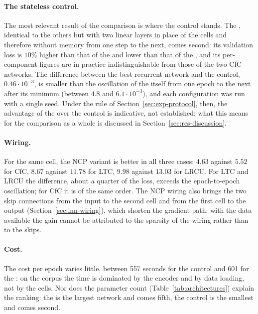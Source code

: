 \paragraph{The stateless control.}
The most relevant result of the comparison is where the control stands. The
, identical to the others but with two linear layers in
place of the cells and therefore without memory from one step to the next, comes
second: its validation loss is $10\%$ higher than that of the
 and lower than that of the , and
its per-component figures are in practice indistinguishable from those of the
two CfC networks. The difference between the best recurrent network and the
control, $0.46\cdot10^{-3}$, is smaller than the oscillation of the
 itself from one epoch to the next after its minimum
(between $4.8$ and $6.1\cdot10^{-3}$), and each configuration was run with a
single seed. Under the rule of Section~\ref{sec:exp-protocol}, then, the
advantage of the  over the control is indicative, not
established; what this means for the comparison as a whole is discussed in
Section~\ref{sec:res-discussion}.

\paragraph{Wiring.}
For the same cell, the NCP variant is better in all three cases: $4.63$ against
$5.52$ for CfC, $8.67$ against $11.78$ for LTC, $9.98$ against $13.03$ for LRCU.
For LTC and LRCU the difference, about a quarter of the loss, exceeds the
epoch-to-epoch oscillation; for CfC it is of the same order. The NCP wiring also
brings the two skip connections from the input to the second cell and from the
first cell to the output (Section~\ref{sec:lnn-wiring}), which shorten the
gradient path: with the data available the gain cannot be attributed to the
sparsity of the wiring rather than to the skips.

\paragraph{Cost.}
The cost per epoch varies little, between \num{557} seconds for the control and
\num{601} for the : on the corpus the time is dominated
by the encoder and by data loading, not by the cells. Nor does the parameter
count (Table~\ref{tab:architectures}) explain the ranking: the
 is the largest network and comes fifth, the control is
the smallest and comes second.

